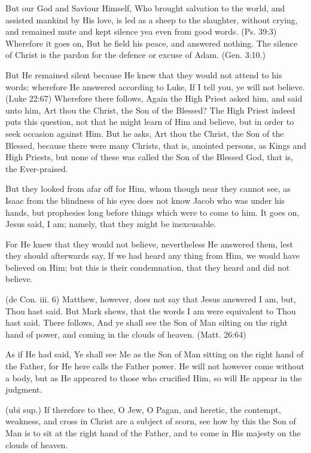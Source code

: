  But our God and Saviour Himself, Who brought salvation to the world, and assisted mankind by His love, is led as a sheep to the slaughter, without crying, and remained mute and kept silence yea even from good words. (Ps. 39:3) Wherefore it goes on, But he field his peace, and answered nothing. The silence of Christ is the pardon for the defence or excuse of Adam. (Gen. 3:10.)

 But He remained silent because He knew that they would not attend to his words; wherefore He answered according to Luke, If I tell you, ye will not believe. (Luke 22:67) Wherefore there follows, Again the High Priest asked him, and said unto him, Art thou the Christ, the Son of the Blessed? The High Priest indeed puts this question, not that he might learn of Him and believe, but in order to seek occasion against Him. But he asks, Art thou the Christ, the Son of the Blessed, because there were many Christs, that is, anointed persons, as Kings and High Priests, but none of these was called the Son of the Blessed God, that is, the Ever-praised.

 But they looked from afar off for Him, whom though near they cannot see, as Isaac from the blindness of his eyes does not know Jacob who was under his hands, but prophesies long before things which were to come to him. It goes on, Jesus said, I am; namely, that they might be inexcusable.

 For He knew that they would not believe, nevertheless He answered them, lest they should afterwards say, If we had heard any thing from Him, we would have believed on Him; but this is their condemnation, that they heard and did not believe.

 (de Con. iii. 6) Matthew, however, does not say that Jesus answered I am, but, Thou hast said. But Mark shews, that the words I am were equivalent to Thou hast said. There follows, And ye shall see the Son of Man silting on the right hand of power, and coming in the clouds of heaven. (Matt. 26:64)

 As if He had said, Ye shall see Me as the Son of Man sitting on the right hand of the Father, for He here calls the Father power. He will not however come without a body, but as He appeared to those who crucified Him, so will He appear in the judgment.

 (ubi sup.) If therefore to thee, O Jew, O Pagan, and heretic, the contempt, weakness, and cross in Christ are a subject of scorn, see how by this the Son of Man is to sit at the right hand of the Father, and to come in His majesty on the clouds of heaven.

